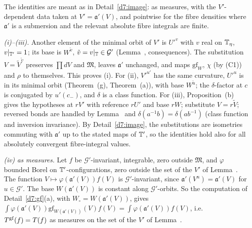 \begin{detail}\label{d7:gfinv}
The identities are meant as in Detail~\ref{d7:image}: as measures, with the $V'$-dependent data taken at $V'=\mathfrak a'(V)$, and pointwise for the fibre densities where $\mathfrak a'$ is a submersion and the relevant absolute fibre integrals are finite.
\begin{step}
\emph{(i)--(iii).} Another element of the minimal orbit of $V'$ is $U'^v$ with $v$ real on $\mathbb T_\eta$, $v|_{\mathbb T'}=1$; its base is $W^{\tilde v}$, $\tilde v=v|_\mathbb T\in\mathcal G'$ (Lemma~, consequences). The substitution $V=\tilde V^{\tilde v}$ preserves $\prod dV$ and $\mathfrak M$, leaves $\mathfrak a'$ unchanged, and maps $\mathrm{gf}_W$, $\chi$ (by (C1)) and $\rho$ to themselves. This proves (i). For (ii), $V'^{u'}$ has the same curvature, $U'^u$ is in its minimal orbit (Theorem~(g), Theorem~(a)), with base $W^{\tilde u}$; the $\delta$-factor at $c$ is conjugated by $u'(c_-)$, and $\delta$ is a class function. For (iii), Proposition~(b) gives the hypotheses at $rV'$ with reference $rU'$ and base $rW$; substitute $V=r\tilde V$; reversed bonds are handled by Lemma~ and $\delta(a^{-1}b)=\delta(ab^{-1})$ (class function and inversion invariance). By Detail~\ref{d7:image}, the substitutions are isometries commuting with $\mathfrak a'$ up to the stated maps of $\mathbb T'$, so the identities hold also for all absolutely convergent fibre-integral values.
\end{step}
\begin{step}
\emph{(iv) as measures.} Let $f$ be $\mathcal G'$-invariant, integrable, zero outside $\mathfrak M$, and $\varphi$ bounded Borel on $\mathbb T'$-configurations, zero outside the set of the $V'$ of Lemma~. The function $V\mapsto\varphi(\mathfrak a'(V))f(V)$ is $\mathcal G'$-invariant, since $\mathfrak a'(V^u)=\mathfrak a'(V)$ for $u\in\mathcal G'$. The base $W(\mathfrak a'(V))$ is constant along $\mathcal G'$-orbits. So the computation of Detail~\ref{d7:gf}(a), with $W_\circ=W(\mathfrak a'(V))$, gives $\int\varphi(\mathfrak a'(V))\mathrm{gf}_{W(\mathfrak a'(V))}(V)f(V)=\int\varphi(\mathfrak a'(V))f(V)$, i.e.\ $T^{\rm gf}(f)=T(f)$ as measures on the set of the $V'$ of Lemma~.
\end{step}
\begin{step}

\end{step}
\end{detail}
